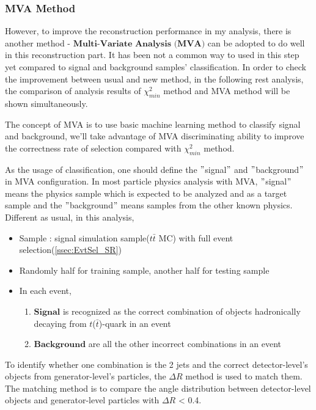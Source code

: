 		\subsubsection{MVA Method}
		\label{sssec:mva_intro} 

			However, to improve the reconstruction performance in my analysis, there is another method - $\textbf{Multi-Variate Analysis (MVA)}$ can be adopted to do well in this reconstruction part. It has been not a common way to used in this step yet compared to signal and background samples' classification. In order to check the improvement between usual and new method, in the following rest analysis, the comparison of analysis results of $\chi^2_{min}$ method and MVA method will be shown simultaneously. 

			The concept of MVA is to use basic machine learning method to classify signal and background, we'll take advantage of MVA discriminating ability to improve the correctness rate of selection compared with $\chi^2_{min}$ method.
				
			As the usage of classification, one should define the $"$signal$"$ and $"$background$"$ in MVA configuration. In most particle physics analysis with MVA, $"$signal$"$ means the physics sample which is expected to be analyzed and as a target sample and the $"$background$"$ means samples from the other known physics. Different as usual, in this analysis,

			\begin{itemize}

				\item Sample : signal simulation sample($t\bar{t}$ MC) with full event selection(\ref{ssec:EvtSel_SR})
				\item Randomly half for training sample, another half for testing sample
				\item In each event,
				\begin{enumerate}
					\item $\textbf{Signal}$ is recognized as the correct combination of objects hadronically decaying from $t$($\bar{t}$)-quark in an event
					\item $\textbf{Background}$ are all the other incorrect combinations in an event
				\end{enumerate}
			\end{itemize}

			To identify whether one combination is the 2 jets and the correct detector-level's objects from generator-level's particles, the $\Delta R$ method is used to match them. The matching method is to compare the angle distribution between detector-level objects and generator-level particles with $\Delta R$ < 0.4. 
			
